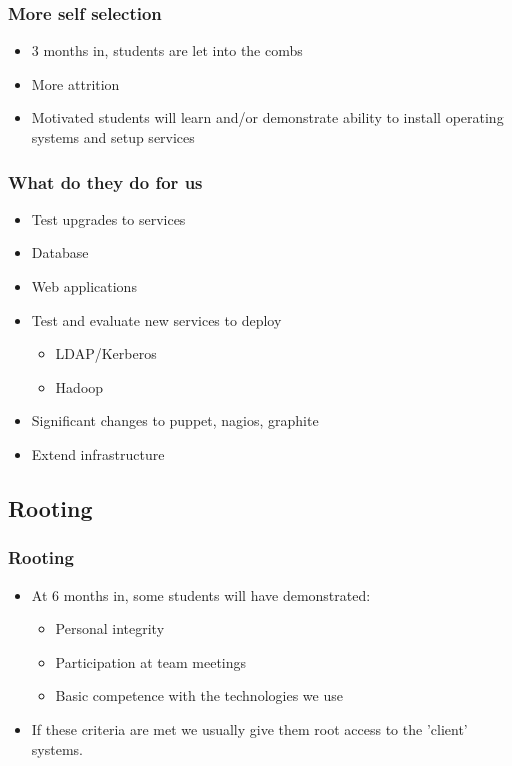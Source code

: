 \documentclass{beamer}
\begin{document}
\frame
{
    \frametitle{More self selection}
    \begin{itemize}
      \item 3 months in, students are let into the combs
      \item More attrition
      \item Motivated students will learn and/or demonstrate ability to install operating systems and setup services
    \end{itemize}
}

\frame
{
    \frametitle{What do they do for us}
    \begin{itemize}
      \item Test upgrades to services
      \item Database
      \item Web applications
    \end{itemize}
    \begin{itemize}
      \item Test and evaluate new services to deploy
    \begin{itemize}
      \item LDAP/Kerberos
      \item Hadoop
    \end{itemize}
      \item Significant changes to puppet, nagios, graphite
      \item Extend infrastructure
    \end{itemize}
}

\subsection{Rooting}
\frame
{
    \frametitle{Rooting}
    \begin{itemize}
      \item At 6 months in, some students will have demonstrated:
      \begin{itemize}
        \item Personal integrity
        \item Participation at team meetings
        \item Basic competence with the technologies we use
      \end{itemize}
      \item If these criteria are met we usually give them root access to the 'client' systems.
    \end{itemize}
}
\end{document}
